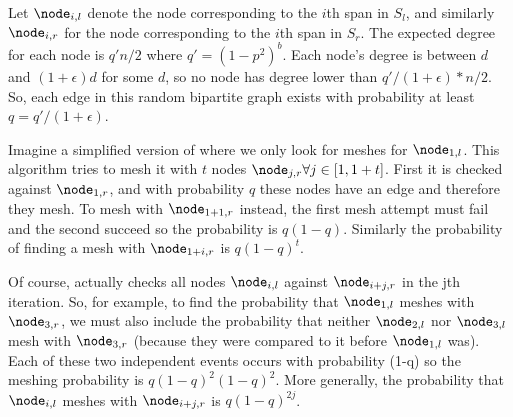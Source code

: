 \iffalse
Let $\node_{i,l}$ denote the node corresponding to the $i$th span in $S_l$, and similarly $\node_{i,r}$ for the node corresponding to the $i$th span in $S_r$.  The expected degree for each node is $q'n/2$ where $q' = (1-p^2)^b$. Each node's degree is between $d$ and $(1+\epsilon)d$ for some $d$, so no node has degree lower than $q'/(1+\epsilon)* n/2$.  So, each edge in this random bipartite graph exists with probability at least $q = q'/(1+\epsilon)$.


Imagine a simplified version of \sm where we only look for meshes for $\node_{1,l}$.  This algorithm tries to mesh it with $t$ nodes $\node_{j,r} \forall j \in [1,1+t]$.  First it is checked against $\node_{1,r}$, and with probability $q$ these nodes have an edge and therefore they mesh.  To mesh with $\node_{1+1,r}$ instead, the first mesh attempt must fail and the second succeed so the probability is $q(1-q)$.  Similarly the probability of finding a mesh with $\node_{1+i,r}$ is $q(1-q)^t$.

Of course, \sm actually checks all nodes $\node_{i,l}$ against $\node_{i+j,r}$ in the jth iteration.  So, for example, to find the probability that $\node_{1,l}$ meshes with $\node_{3,r}$, we must also include the probability that neither $\node_{2,l}$ nor $\node_{3,l}$ mesh with $\node_{3,r}$ (because they were compared to it before $\node_{1,l}$ was).  Each of these two independent events occurs with probability (1-q) so the meshing probability is $q(1-q)^2(1-q)^2$.  More generally, the probability that $\node_{i,l}$ meshes with $\node_{i+j,r}$ is $q(1-q)^{2j}$.

